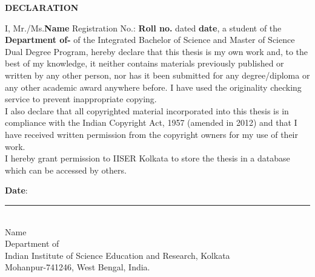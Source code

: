 
\begin{center}
  {\Large{\bf{DECLARATION}}}
\end{center}

\vspace{2em}
I, Mr./Ms.\textbf{Name} Registration No.: \textbf{Roll no.} dated \textbf{date}, a student of the \textbf{Department of-} of the Integrated Bachelor of Science and Master of Science Dual Degree Program, hereby declare that this thesis is my own work and, to the best of my knowledge, it neither contains materials previously published or written by any other person, nor has it been submitted for any degree/diploma or any other academic award
anywhere before. I have used the originality checking service to prevent inappropriate copying.\\

\noindent I also declare that all copyrighted material incorporated into this thesis is in compliance with the Indian Copyright Act, 1957 (amended in 2012) and that I have received written permission from the copyright owners for my use of their work.\\

\noindent I hereby grant permission to IISER Kolkata to store the thesis in a database which can be accessed by others.


\vspace{3em} 

\noindent \textbf{Date}:  \hfill   

\vspace{1cm}
\begin{flushleft}
\rule{6cm}{0.4pt}\\
Name\\
Department of \\
Indian Institute of Science Education and Research, Kolkata\\
Mohanpur-741246, West Bengal, India.
\end{flushleft}

\clearpage


